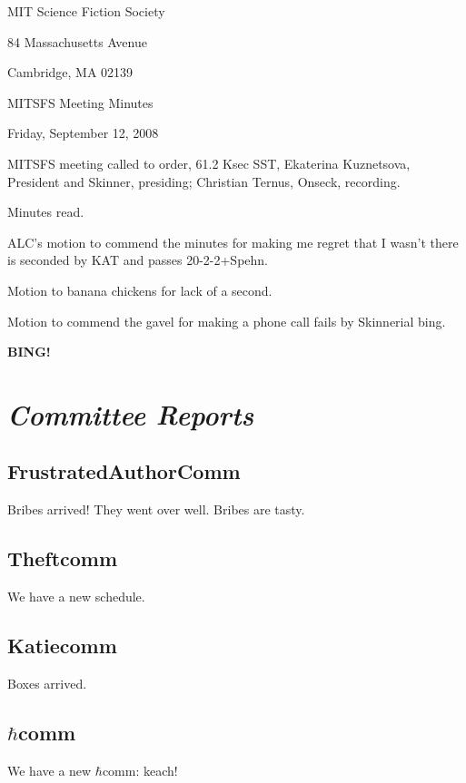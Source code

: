 \documentclass[10pt]{article}
\newcommand{\bing}{{\bf BING!} }
\newcommand{\goto}[1]{\bing \vskip 12pt \section*{{\em{#1}}}}
\begin{document}
\begin{center}

MIT Science Fiction Society

84 Massachusetts Avenue

Cambridge, MA 02139

\vspace{12pt}

MITSFS Meeting Minutes

Friday, September 12, 2008

\end{center}

\vspace{18pt}

\setlength{\parskip}{6pt}

\noindent
MITSFS meeting called to order, 61.2 Ksec SST,
Ekaterina Kuznetsova, President and Skinner, presiding; Christian Ternus, Onseck, recording.

Minutes read.

ALC's motion to commend the minutes for making me regret that I wasn't
there is seconded by KAT and passes 20-2-2+Spehn.  

Motion to banana
chickens for lack of a second.  

Motion to commend the gavel for making a phone call fails by
Skinnerial bing.

\goto{Committee Reports}

\subsection*{FrustratedAuthorComm}

Bribes arrived!  They went over well.  Bribes are tasty.

\subsection*{Theftcomm}

We have a new schedule.

\subsection*{Katiecomm}

Boxes arrived.

\subsection*{$\hbar$comm}

We have a new $\hbar$comm: keach!
\end{document}
